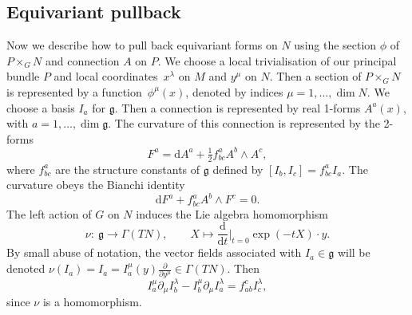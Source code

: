 \documentclass[pdftex]{sigma}
\newcommand{\g}{{\mathfrak{g}}}
\newcommand{\1}{{\mathbb{1}}}
\newcommand{\lto}{\longrightarrow}
\def \d{\mathrm{d}}
\numberwithin{equation}{section}
\begin{document}
\subsection{Equivariant pullback}
Now we describe how to pull back equivariant forms on $N$ using the section $\phi$ of $P\times_GN$ and connection $A$ on $P$. We choose a local trivialisation of our principal bundle $P$ and local coordinates~$x^\lambda$ on $M$ and $y^\mu$ on $N$. Then a section of $P\times_G N$ is represented by a function~$\phi^\mu(x)$, denoted by indices $\mu=1,\dots,\dim N$. We choose a basis $I_a$ for $\g$. Then a connection is represented by real 1-forms $A^a(x)$, with $a=1,\dots,\dim \g$. The curvature of this connection is represented by the 2-forms
\begin{equation*}
F^a=\d A^a+\tfrac{1}{2}f^{a}_{bc}A^b\wedge A^c,
\end{equation*}
where $f^a_{bc}$ are the structure constants of $\g$ defined by $[I_b,I_c]=f^a_{bc}I_a$. The curvature obeys the Bianchi identity
\begin{equation}\label{bianchi}
\d F^a + f^a_{bc}A^b\wedge F^c = 0.
\end{equation}
The left action of $G$ on $N$ induces the Lie algebra homomorphism
\begin{equation}\label{nu-definition}
\nu\colon \ \g\lto\Gamma(TN),\qquad X \mapsto \frac{\d}{\d t}\Big|_{t=0}\exp(-tX)\cdot y.
\end{equation}
By small abuse of notation, the vector fields associated with $I_a\in\g$ will be denoted $\nu(I_a)=I_a=I_a^\mu(y)\frac{\partial}{\partial y^\mu}\in\Gamma(TN)$. Then
\begin{equation}\label{Lie bracket}
I_a^\mu\partial_\mu I_b^\lambda - I_b^\mu \partial_\mu I_a^\lambda = f_{ab}^cI_c^\lambda,
\end{equation}
since $\nu$ is a homomorphism.
\end{document}
